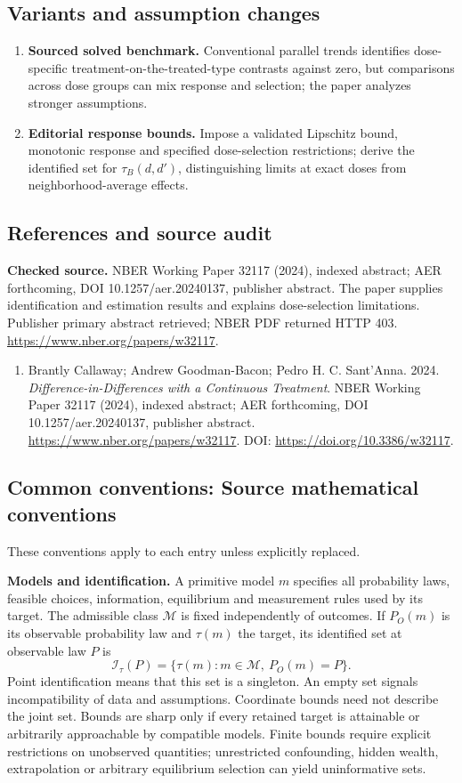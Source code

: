 \documentclass[11pt,a4paper]{article}
\begin{document}
\subsection*{Variants and assumption changes}
\begin{enumerate}
\item \textbf{Sourced solved benchmark.} Conventional parallel trends identifies dose-specific treatment-on-the-treated-type contrasts against zero, but comparisons across dose groups can mix response and selection; the paper analyzes stronger assumptions.
\item \textbf{Editorial response bounds.} Impose a validated Lipschitz bound, monotonic response and specified dose-selection restrictions; derive the identified set for \(\tau_B(d,d')\), distinguishing limits at exact doses from neighborhood-average effects.
\end{enumerate}
\subsection*{References and source audit}
\textbf{Checked source.} NBER Working Paper 32117 (2024), indexed abstract; AER forthcoming, DOI 10.1257/aer.20240137, publisher abstract. The paper supplies identification and estimation results and explains dose-selection limitations. Publisher primary abstract retrieved; NBER PDF returned HTTP 403. \url{https://www.nber.org/papers/w32117}.
\begin{enumerate}\raggedright
\item\hypertarget{definitions:source:30007705:1}{} Brantly Callaway; Andrew Goodman-Bacon; Pedro H. C. Sant'Anna. 2024. \emph{Difference-in-Differences with a Continuous Treatment}. NBER Working Paper 32117 (2024), indexed abstract; AER forthcoming, DOI 10.1257/aer.20240137, publisher abstract.
\url{https://www.nber.org/papers/w32117}.
DOI: \url{https://doi.org/10.3386/w32117}.
\end{enumerate}

\subsection*{Common conventions: Source mathematical conventions}

These conventions apply to each entry unless explicitly replaced.

\textbf{Models and identification.} A primitive model \(m\) specifies all probability laws, feasible choices, information, equilibrium and measurement rules used by its target. The admissible class \(\mathcal M\) is fixed independently of outcomes. If \(P_O(m)\) is its observable probability law and \(\tau(m)\) the target, its identified set at observable law \(P\) is
\[
 \mathcal I_\tau(P)=\{\tau(m):m\in\mathcal M,\ P_O(m)=P\}.
\]
Point identification means that this set is a singleton. An empty set signals incompatibility of data and assumptions. Coordinate bounds need not describe the joint set. Bounds are sharp only if every retained target is attainable or arbitrarily approachable by compatible models. Finite bounds require explicit restrictions on unobserved quantities; unrestricted confounding, hidden wealth, extrapolation or arbitrary equilibrium selection can yield uninformative sets.
\end{document}
